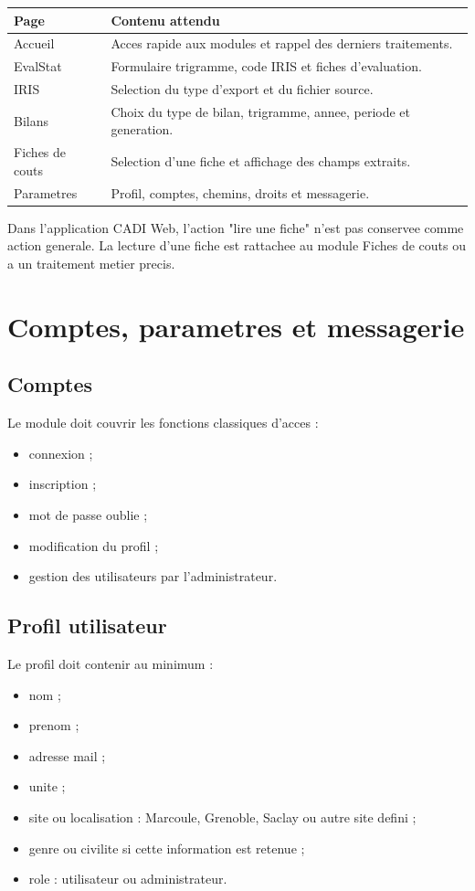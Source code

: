 \documentclass[11pt,a4paper]{report}
\begin{document}
\begin{longtable}{L{4cm} L{10cm}}
\toprule
{}
\textbf{Page} & \textbf{Contenu attendu} \\
\midrule
Accueil & Acces rapide aux modules et rappel des derniers traitements. \\
EvalStat & Formulaire trigramme, code IRIS et fiches d'evaluation. \\
IRIS & Selection du type d'export et du fichier source. \\
Bilans & Choix du type de bilan, trigramme, annee, periode et generation. \\
Fiches de couts & Selection d'une fiche et affichage des champs extraits. \\
Parametres & Profil, comptes, chemins, droits et messagerie. \\
\bottomrule
\end{longtable}

Dans l'application CADI Web, l'action "lire une fiche" n'est pas conservee comme action generale. La lecture d'une fiche est rattachee au module Fiches de couts ou a un traitement metier precis.

\chapter{Comptes, parametres et messagerie}

\section{Comptes}

Le module doit couvrir les fonctions classiques d'acces :

\begin{itemize}
  \item connexion ;
  \item inscription ;
  \item mot de passe oublie ;
  \item modification du profil ;
  \item gestion des utilisateurs par l'administrateur.
\end{itemize}

\section{Profil utilisateur}

Le profil doit contenir au minimum :

\begin{itemize}
  \item nom ;
  \item prenom ;
  \item adresse mail ;
  \item unite ;
  \item site ou localisation : Marcoule, Grenoble, Saclay ou autre site defini ;
  \item genre ou civilite si cette information est retenue ;
  \item role : utilisateur ou administrateur.
\end{itemize}
\end{document}
